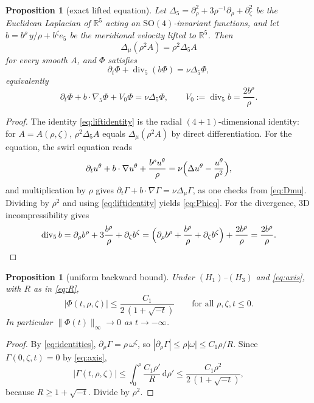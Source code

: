 \documentclass[11pt]{article}
\newtheorem{proposition}[theorem]{Proposition}
\theoremstyle{definition}
\newcommand{\R}{\mathbb{R}}
\newcommand{\dd}{\,\mathrm{d}}
\newcommand{\Div}{\operatorname{div}}
\begin{document}
\begin{proposition}[exact lifted equation]\label{prop:lift}
Let $\Delta_5=\partial_\rho^2+3\rho^{-1}\partial_\rho+\partial_\zeta^2$ be the
Euclidean Laplacian of $\R^5$ acting on $\mathrm{SO}(4)$-invariant functions,
and let $b=b^\rho\,y/\rho+b^\zeta e_5$ be the meridional velocity lifted to
$\R^5$. Then
\begin{equation}\label{eq:liftidentity}
\Delta_\mu(\rho^2A)=\rho^2\Delta_5A
\end{equation}
for every smooth $A$, and $\Phi$ satisfies
\begin{equation}\label{eq:Phieq}
\partial_t\Phi+\Div_5(b\Phi)=\nu\Delta_5\Phi,
\end{equation}
equivalently
\begin{equation}\label{eq:Phieq2}
\partial_t\Phi+b\cdot\nabla_5\Phi+V_0\Phi=\nu\Delta_5\Phi,\qquad
V_0:=\Div_5b=\frac{2b^\rho}{\rho}.
\end{equation}
\end{proposition}
\begin{proof}
The identity \eqref{eq:liftidentity} is the radial $(4+1)$-dimensional
identity: for $A=A(\rho,\zeta)$, $\rho^2\Delta_5A$ equals
$\Delta_\mu(\rho^2A)$ by direct differentiation. For the equation, the swirl
equation reads
\begin{equation}
\partial_t u^\theta+b\cdot\nabla u^\theta+\frac{b^\rho u^\theta}{\rho}
=\nu\Bigl(\Delta u^\theta-\frac{u^\theta}{\rho^2}\Bigr),
\end{equation}
and multiplication by $\rho$ gives
$\partial_t\Gamma+b\cdot\nabla\Gamma=\nu\Delta_\mu\Gamma$, as one checks
from \eqref{eq:Dmu}. Dividing by $\rho^2$ and using \eqref{eq:liftidentity}
yields \eqref{eq:Phieq}. For the divergence, $3$D incompressibility gives
\begin{equation}
\Div_5b=\partial_\rho b^\rho+3\frac{b^\rho}{\rho}+\partial_\zeta b^\zeta
=\Bigl(\partial_\rho b^\rho+\frac{b^\rho}{\rho}+\partial_\zeta b^\zeta\Bigr)
+\frac{2b^\rho}{\rho}=\frac{2b^\rho}{\rho}.
\end{equation}
\end{proof}

\begin{proposition}[uniform backward bound]\label{prop:bound}
Under $(H_1)$--$(H_3)$ and \eqref{eq:axis}, with $R$ as in
\eqref{eq:R},
\begin{equation}\label{eq:bound}
|\Phi(t,\rho,\zeta)|\le\frac{C_1}{2\,(1+\sqrt{-t})}
\qquad\text{for all }\rho,\zeta,t\le0 .
\end{equation}
In particular $\|\Phi(t)\|_\infty\to0$ as $t\to-\infty$.
\end{proposition}
\begin{proof}
By \eqref{eq:identities}, $\partial_\rho\Gamma=\rho\,\omega^\zeta$, so
$|\partial_\rho\Gamma|\le\rho|\omega|\le C_1\rho/R$. Since
$\Gamma(0,\zeta,t)=0$ by \eqref{eq:axis},
\begin{equation}
|\Gamma(t,\rho,\zeta)|\le\int_0^\rho\frac{C_1\rho'}{R}\dd\rho'
\le\frac{C_1\rho^2}{2\,(1+\sqrt{-t})},
\end{equation}
because $R\ge1+\sqrt{-t}$. Divide by $\rho^2$.
\end{proof}
\end{document}
